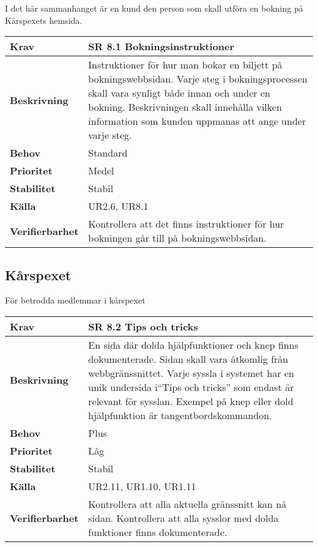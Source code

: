 \documentclass[a4paper, twoside, 11pt, titlepage]{article}
\begin{document}
	I det här sammanhanget är en kund den person som skall utföra en bokning på Kårspexets hemsida.

	\begin{tabular} { p{2.6cm} p{12.5cm} }
		\hline
		\sffamily\textbf{Krav} & \sffamily\textbf{SR 8.1 Bokningsinstruktioner } \\
		\hline
		\sffamily\textbf{Beskrivning} & Instruktioner för hur man bokar en biljett på bokningswebbsidan. Varje steg i bokningsprocessen skall vara synligt både innan och under en bokning. Beskrivningen skall innehålla vilken information som kunden uppmanas att ange under varje steg.  \\
		\hline
		\sffamily\textbf{Behov} & Standard  \\
		\hline
		\sffamily\textbf{Prioritet} & Medel  \\
		\hline
		\sffamily\textbf{Stabilitet} & Stabil  \\
		\hline
		\sffamily\textbf{Källa} & UR2.6, UR8.1  \\
		\hline
		\sffamily\textbf{Verifierbarhet} & Kontrollera att det finns instruktioner för hur bokningen går till på bokningswebbsidan.  \\
		\hline
	\end{tabular}


	\subsection{Kårspexet}


	För betrodda medlemmar i kårspexet

	\begin{tabular} { p{2.6cm} p{12.5cm} }
		\hline
		\sffamily\textbf{Krav} & \sffamily\textbf{SR 8.2 Tips och tricks } \\
		\hline
		\sffamily\textbf{Beskrivning} & En sida där dolda hjälpfunktioner och knep finns dokumenterade. Sidan skall vara åtkomlig från webbgränssnittet. Varje syssla i systemet har en unik undersida i``Tips och tricks'' som endast är relevant för sysslan. Exempel på knep eller dold hjälpfunktion är tangentbordskommandon.  \\
		\hline
		\sffamily\textbf{Behov} & Plus  \\
		\hline
		\sffamily\textbf{Prioritet} & Låg  \\
		\hline
		\sffamily\textbf{Stabilitet} & Stabil  \\
		\hline
		\sffamily\textbf{Källa} & UR2.11, UR1.10, UR1.11  \\
		\hline
		\sffamily\textbf{Verifierbarhet} & Kontrollera att alla aktuella gränssnitt kan nå sidan. Kontrollera att alla sysslor med dolda funktioner finns dokumenterade.  \\
		\hline
	\end{tabular}
	\vspace{6mm}
\end{document}
